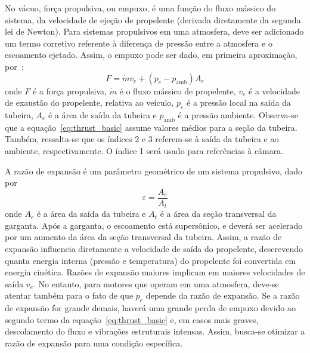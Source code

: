 No vácuo, força propulsiva, ou empuxo, é uma função do fluxo mássico do sistema, da velocidade de ejeção de propelente (derivada diretamente da segunda lei de Newton). Para sistemas propulsivos em uma atmosfera, deve ser adicionado um termo corretivo referente à diferença de pressão entre a atmosfera e o escoamento ejetado. Assim, o empuxo pode ser dado, em primeira aproximação, por~\cite{Sutton}:
\begin{equation}
    \label{eq:thrust_basic}
    F = \dot{m} v_e + (p_e - p_{\mathrm{amb}}) A_e
\end{equation}
onde \(F\) é a força propulsiva, \(\dot{m}\) é o fluxo mássico de propelente, \(v_e\) é a velocidade de exaustão do propelente, relativa ao veículo, \(p_e\) é a pressão local na saída da tubeira, \(A_e\) é a área de saída da tubeira e \(p_{\mathrm{amb}}\) é a pressão ambiente. Observa-se que a equação~\ref{eq:thrust_basic} assume valores médios para a seção da tubeira. Também, ressalta-se que os índices 2 e 3 referem-se à saída da tubeira e ao ambiente, respectivamente. O índice 1 será usado para referências à câmara.

A razão de expansão é um parâmetro geométrico de um sistema propulsivo, dado por
\begin{equation}
    \label{eq:exp_ratio}
    \varepsilon = \frac{A_e}{A_t}
\end{equation}
onde \(A_e\) é a área da saída da tubeira e \(A_t\) é a área da seção transversal da garganta. Após a garganta, o escoamento está supersônico, e deverá ser acelerado por um aumento da área da seção transversal da tubeira. Assim, a razão de expansão influencia diretamente a velocidade de saída do propelente, descrevendo quanta energia interna (pressão e temperatura) do propelente foi convertida em energia cinética. Razões de expansão maiores implicam em maiores velocidades de saída \(v_e\). No entanto, para motores que operam em uma atmosfera, deve-se atentar também para o fato de que \(p_e\) depende da razão de expansão. Se a razão de expansão for grande demais, haverá uma grande perda de empuxo devido ao segundo termo da equação~\ref{eq:thrust_basic} e, em casos mais graves, descolamento do fluxo e vibrações estruturais intensas. Assim, busca-se otimizar a razão de expansão para uma condição específica.

